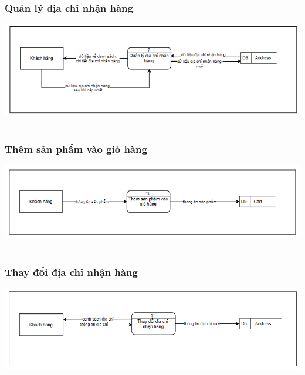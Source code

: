 \documentclass[12pt,a4paper,2sides]{report}
\begin{document}
\subsubsection{Quản lý địa chỉ nhận hàng}
    \includegraphics[width=1\linewidth]{lib/DFD/quanlydiachinh.png}\\\vspace*{1cm}
    \hspace{4cm}{Hình 6. Quản lý địa chỉ nhận hàng}\\
\subsubsection{Thêm sản phẩm vào giỏ hàng}
    \includegraphics[width=1\linewidth]{lib/DFD/themspvaogio.png}\\\vspace*{1cm}
    \hspace{4cm}{Hình 7. Thêm sản phẩm vào giỏ hàng}\\
\subsubsection{Thay đổi địa chỉ nhận hàng}
    \includegraphics[width=1\linewidth]{lib/DFD/thaydoidiachinh.png}\\\vspace*{1cm}
    \hspace{4cm}{Hình 8. Thay đổi địa chỉ nhận hàng}\\
\end{document}
